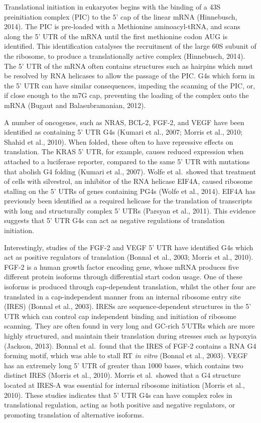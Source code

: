 \documentclass[12pt,a4paper,]{report}
\begin{document}
Translational initiation in eukaryotes begins with the binding of a 43S
preinitiation complex (PIC) to the 5' cap of the linear mRNA
(Hinnebusch, 2014). The PIC is pre-loaded with a Methionine
aminoacyl-tRNA, and scans along the 5' UTR of the mRNA until the first
methionine codon AUG is identified. This identification catalyses the
recruitment of the large 60S subunit of the ribosome, to produce a
translationally active complex (Hinnebusch, 2014). The 5' UTR of the
mRNA often contains structures such as hairpins which must be resolved
by RNA helicases to allow the passage of the PIC. G4s which form in the
5' UTR can have similar consequences, impeding the scanning of the PIC,
or, if close enough to the m7G cap, preventing the loading of the
complex onto the mRNA (Bugaut and Balasubramanian, 2012).

A number of oncogenes, such as NRAS, BCL-2, FGF-2, and VEGF have been
identified as containing 5' UTR G4s (Kumari et al., 2007; Morris et al.,
2010; Shahid et al., 2010). When folded, these often to have repressive
effects on translation. The KRAS 5' UTR, for example, causes reduced
expression when attached to a luciferase reporter, compared to the same
5' UTR with mutations that abolish G4 folding (Kumari et al., 2007).
Wolfe et al.~showed that treatment of cells with silvestrol, an
inhibitor of the RNA helicase EIF4A, caused ribosome stalling on the 5'
UTRs of genes containing PG4s (Wolfe et al., 2014). EIF4A has previously
been identified as a required helicase for the translation of
transcripts with long and structurally complex 5' UTRs (Parsyan et al.,
2011). This evidence suggests that 5' UTR G4s can act as negative
regulations of translation initiation.

Interestingly, studies of the FGF-2 and VEGF 5' UTR have identified G4s
which act as positive regulators of translation (Bonnal et al., 2003;
Morris et al., 2010). FGF-2 is a human growth factor encoding gene,
whose mRNA produces five different protein isoforms through differential
start codon usage. One of these isoforms is produced through
cap-dependent translation, whilst the other four are translated in a
cap-independent manner from an internal ribosome entry site (IRES)
(Bonnal et al., 2003). IRESs are sequence-dependent structures in the 5'
UTR which can control cap independent binding and initiation of ribosome
scanning. They are often found in very long and GC-rich 5'UTRs which are
more highly structured, and maintain their translation during stresses
such as hypoxyia (Jackson, 2013). Bonnal et al.~found that the IRES of
FGF-2 contains a RNA G4 forming motif, which was able to stall RT
\emph{in vitro} (Bonnal et al., 2003). VEGF has an extremely long 5' UTR
of greater than 1000 bases, which contains two distinct IRES (Morris et
al., 2010). Morris et al.~showed that a G4 structure located at IRES-A
was essential for internal ribosome initiation (Morris et al., 2010).
These studies indicates that 5' UTR G4s can have complex roles in
translational regulation, acting as both positive and negative
regulators, or promoting translation of alternative isoforms.
\end{document}
